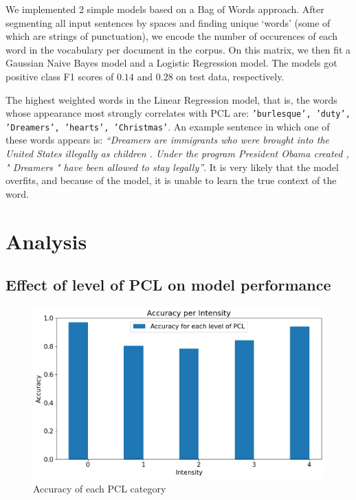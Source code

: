 \documentclass[11pt,a4paper]{article}
\begin{document}
We implemented 2 simple models based on a Bag of Words approach. After segmenting all input sentences by spaces and finding unique `words' (some of which are strings of punctuation), we encode the number of occurences of each word in the vocabulary per document in the corpus. On this matrix, we then fit a Gaussian Naive Bayes model and a Logistic Regression model. The models got positive class F1 scores of $0.14$ and $0.28$ on test data, respectively.

The highest weighted words in the Linear Regression model, that is, the words whose appearance most strongly correlates with PCL are: \texttt{'burlesque', 'duty', 'Dreamers', 'hearts', 'Christmas'}. An example sentence in which one of these words appears is: \emph{``Dreamers are immigrants who were brought into the United States illegally as children . Under the program President Obama created , " Dreamers " have been allowed to stay legally''}. It is very likely that the model overfits, and because of the model, it is unable to learn the true context of the word.

\section{Analysis}

\subsection*{Effect of level of PCL on model performance}

\begin{figure}[H]
    \centering
    \includegraphics[width=\linewidth]{figures/accuracy_per_pecl_lebl.png}
    \caption{Accuracy of each PCL category}
    \label{fig:accuracy-per-pcl-cateogry}
\end{figure}
\end{document}
